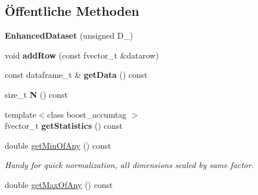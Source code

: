\subsection*{Öffentliche Methoden}
\begin{DoxyCompactItemize}
\item 
\hypertarget{classCDA_1_1EnhancedDataset_a38188f6537aecfdb93351da5d0814b4a}{
{\bfseries EnhancedDataset} (unsigned D\_\-)}
\label{classCDA_1_1EnhancedDataset_a38188f6537aecfdb93351da5d0814b4a}

\item 
\hypertarget{classCDA_1_1EnhancedDataset_a396c10698c80b47cd23be67c95dce5d4}{
void {\bfseries addRow} (const fvector\_\-t \&datarow)}
\label{classCDA_1_1EnhancedDataset_a396c10698c80b47cd23be67c95dce5d4}

\item 
\hypertarget{classCDA_1_1EnhancedDataset_abb24dc80e0c2f2e6c2031e4093d6a460}{
const dataframe\_\-t \& {\bfseries getData} () const }
\label{classCDA_1_1EnhancedDataset_abb24dc80e0c2f2e6c2031e4093d6a460}

\item 
\hypertarget{classCDA_1_1EnhancedDataset_aa15349d7a7c21254a2aeb529fba1ecb3}{
size\_\-t {\bfseries N} () const }
\label{classCDA_1_1EnhancedDataset_aa15349d7a7c21254a2aeb529fba1ecb3}

\item 
\hypertarget{classCDA_1_1EnhancedDataset_a922889380d5f8ea30102266a0d1e7a7e}{
{\footnotesize template$<$class boost\_\-accumtag $>$ }\\fvector\_\-t {\bfseries getStatistics} () const }
\label{classCDA_1_1EnhancedDataset_a922889380d5f8ea30102266a0d1e7a7e}

\item 
\hypertarget{classCDA_1_1EnhancedDataset_a664e728858339f8729a5c154d3dbe519}{
double \hyperlink{classCDA_1_1EnhancedDataset_a664e728858339f8729a5c154d3dbe519}{getMinOfAny} () const }
\label{classCDA_1_1EnhancedDataset_a664e728858339f8729a5c154d3dbe519}

\begin{DoxyCompactList}\small\item\em Handy for quick normalization, all dimensions scaled by same factor. \item\end{DoxyCompactList}\item 
\hypertarget{classCDA_1_1EnhancedDataset_a7d063419540f0da32bf6a242e9c0b513}{
double \hyperlink{classCDA_1_1EnhancedDataset_a7d063419540f0da32bf6a242e9c0b513}{getMaxOfAny} () const }
\label{classCDA_1_1EnhancedDataset_a7d063419540f0da32bf6a242e9c0b513}


\end{DoxyCompactItemize}
